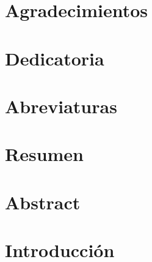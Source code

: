 \documentclass[12 pt]{report}
\begin{document}
    
    
    
    
    
    
    
        \thispagestyle{empty}

    \chapter*{Agradecimientos}
        
            \thispagestyle{empty}

    \chapter*{Dedicatoria}
        
            \thispagestyle{empty}
            
    \begin{singlespace}
        \pagestyle{empty}
            {
             \renewcommand{\thispagestyle}[1]{}
                \tableofcontents
            }
        \pagestyle{plain}
        
         \listoftables
            \thispagestyle{empty}
 
        \pagestyle{empty}
            {
            \renewcommand{\thispagestyle}[1]{}
                \listoffigures
                \thispagestyle{empty}
            }
        \pagestyle{plain}
        
    \end{singlespace}

    \chapter*{Abreviaturas}
        
        \thispagestyle{empty}

    \chapter*{Resumen}
        
        \thispagestyle{empty}
        
    \chapter*{Abstract}
        
        \thispagestyle{empty}

    \chapter{Introducción}
        
\end{document}
